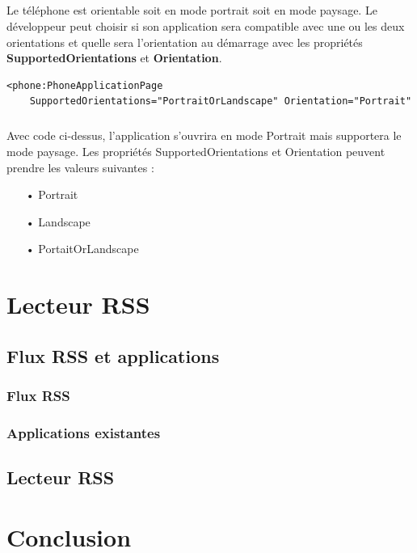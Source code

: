 \documentclass[twoside,UTF8]{EPURapport}
\begin{document}
\paragraph{}
Le téléphone est orientable soit en mode portrait soit en mode paysage. Le développeur peut choisir si son application sera compatible avec une ou les deux orientations et quelle sera l'orientation au démarrage avec les propriétés \textbf{SupportedOrientations} et \textbf{Orientation}.

\begin{lstlisting}[caption={Orientation du téléphone}]
<phone:PhoneApplicationPage 
	SupportedOrientations="PortraitOrLandscape" Orientation="Portrait"
\end{lstlisting}

\paragraph{}
Avec code ci-dessus, l'application s'ouvrira en mode Portrait mais supportera le mode paysage. Les propriétés SupportedOrientations et Orientation peuvent prendre les valeurs suivantes : 
\begin{itemize}
	\item[•] Portrait
	\item[•] Landscape
	\item[•] PortaitOrLandscape
\end{itemize}
	
		

\chapter{Lecteur RSS}
	\section{Flux RSS et applications}
		\subsection{Flux RSS}
		
		\subsection{Applications existantes}

	\section{Lecteur RSS}
	


\chapter{Conclusion}


\printindex
\end{document}
